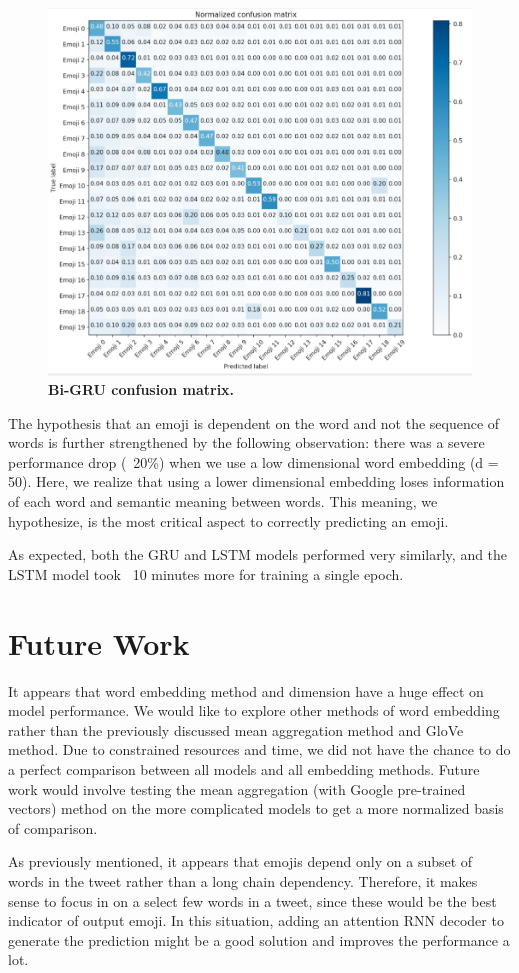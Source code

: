\documentclass[11pt,a4paper]{article}
\begin{document}
	\begin{figure}[H]
		\hspace*{-1.3cm}
		\centering\includegraphics[scale=0.24]{bgru_confusion} 
		\caption{\textbf{Bi-GRU confusion matrix.}}
	\end{figure}

	The hypothesis that an emoji is dependent on the word and not the sequence of words is further strengthened by the following observation: there was a severe performance drop (~20\%) when we use a low dimensional word embedding (d = 50). Here, we realize that using a lower dimensional embedding loses information of each word and semantic meaning between words. This meaning, we hypothesize, is the most critical aspect to correctly predicting an emoji.
	\par
	As expected, both the GRU and LSTM models performed very similarly, and the LSTM model took ~10 minutes more for training a single epoch. 
\section{Future Work}
It appears that word embedding method and dimension have a huge effect on model performance. We would like to explore other methods of word embedding rather than the previously discussed mean aggregation method and GloVe method. Due to constrained resources and time, we did not have the chance to do a perfect comparison between all models and all embedding methods. Future work would involve testing the mean aggregation (with Google pre-trained vectors) method on the more complicated models to get a more normalized basis of comparison.
\par
As previously mentioned, it appears that emojis depend only on a subset of words in the tweet rather than a long chain dependency. Therefore, it makes sense to focus in on a select few words in a tweet, since these would be the best indicator of output emoji. In this situation, adding an attention RNN decoder to generate the prediction might be a good solution and improves the performance a lot. 
\end{document}
